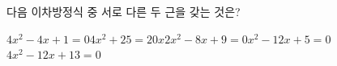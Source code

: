 다음 이차방정식 중 서로 다른 두 근을 갖는 것은?
\begin{choicesii}{$4x^2-4x+1=0$}{$4x^2+25=20x$}{$2x^2-8x+9=0$}{$x^2-12x+5=0$}{$4x^2-12x+13=0$}\end{choicesii}

